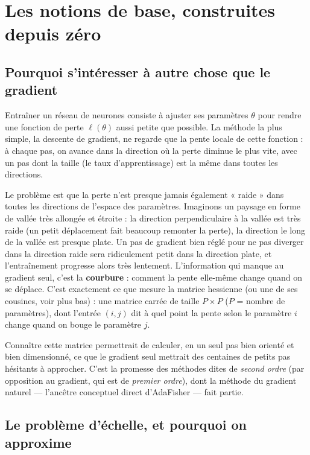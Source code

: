 \documentclass[11pt,a4paper]{article}
\begin{document}
\section{Les notions de base, construites depuis zéro}

\subsection{Pourquoi s'intéresser à autre chose que le gradient}

Entraîner un réseau de neurones consiste à ajuster ses paramètres $\theta$ pour rendre une fonction
de perte $\ell(\theta)$ aussi petite que possible. La méthode la plus simple, la descente de
gradient, ne regarde que la pente locale de cette fonction : à chaque pas, on avance dans la
direction où la perte diminue le plus vite, avec un pas dont la taille (le taux d'apprentissage) est
la même dans toutes les directions.

Le problème est que la perte n'est presque jamais également « raide » dans toutes les directions de
l'espace des paramètres. Imaginons un paysage en forme de vallée très allongée et étroite : la
direction perpendiculaire à la vallée est très raide (un petit déplacement fait beaucoup remonter la
perte), la direction le long de la vallée est presque plate. Un pas de gradient bien réglé pour ne
pas diverger dans la direction raide sera ridiculement petit dans la direction plate, et
l'entraînement progresse alors très lentement. L'information qui manque au gradient seul, c'est la
\textbf{courbure} : comment la pente elle-même change quand on se déplace. C'est exactement ce que
mesure la matrice hessienne (ou une de ses cousines, voir plus bas) : une matrice carrée de taille
$P\times P$ ($P$ = nombre de paramètres), dont l'entrée $(i,j)$ dit à quel point la pente selon le
paramètre $i$ change quand on bouge le paramètre $j$.

Connaître cette matrice permettrait de calculer, en un seul pas bien orienté et bien dimensionné, ce
que le gradient seul mettrait des centaines de petits pas hésitants à approcher. C'est la promesse
des méthodes dites de \emph{second ordre} (par opposition au gradient, qui est de \emph{premier
ordre}), dont la méthode du gradient naturel — l'ancêtre conceptuel direct d'AdaFisher — fait partie.

\subsection{Le problème d'échelle, et pourquoi on approxime}
\end{document}
